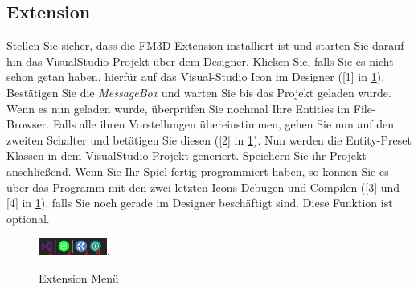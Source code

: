 \subsection{Extension}
Stellen Sie sicher, dass die FM3D-Extension installiert ist und starten Sie darauf hin das VisualStudio-Projekt über dem Designer. Klicken Sie, falls Sie es nicht schon getan haben, hierfür auf das Visual-Studio Icon im Designer ([1] in \cref{extmen}).
Bestätigen Sie die \textit{MessageBox} und warten Sie bis das Projekt geladen wurde.
Wenn es nun geladen wurde, überprüfen Sie nochmal Ihre Entities im File-Browser. Falls alle ihren Vorstellungen übereinstimmen, gehen Sie nun auf den zweiten Schalter und betätigen Sie diesen ([2] in \cref{extmen}).
Nun werden die Entity-Preset Klassen in dem VisualStudio-Projekt generiert. Speichern Sie ihr Projekt anschließend.
Wenn Sie Ihr Spiel fertig programmiert haben, so können Sie es über das Programm mit den zwei letzten Icons Debugen und Compilen ([3] und [4] in \cref{extmen}), falls Sie noch gerade im Designer beschäftigt sind. Diese Funktion ist optional.
\begin{figure}
	\begin{center}
		\includegraphics[width=0.2\textwidth]{04verwendung/Designer/02ExtensionMenu.PNG}.
		\caption{Extension Menü}\label{extmen}
	\end{center}
\end{figure}